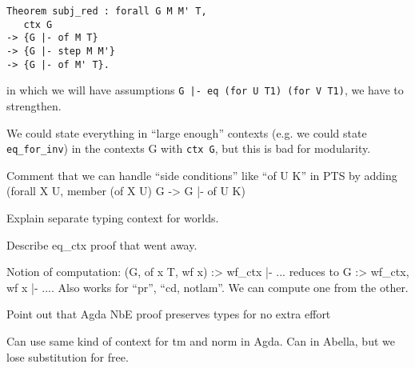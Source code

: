 \documentclass{article}
\begin{document}
\begin{verbatim}
Theorem subj_red : forall G M M' T,
   ctx G
-> {G |- of M T}
-> {G |- step M M'}
-> {G |- of M' T}.
\end{verbatim}

in which we will have assumptions
{\tt {G |- eq (for U T1) (for V T1)}}, we have to strengthen.

We could state everything in ``large enough'' contexts (e.g. we could
state {\tt eq\_for\_inv}) in the contexts G with {\tt ctx G}, but this is
bad for modularity.

Comment that we can handle ``side conditions'' like ``of U K'' in PTS
by adding (forall X U, member (of X U) G -> {G |- of U K})

Explain separate typing context for worlds.

Describe eq\_ctx proof that went away.

Notion of computation: { (G, of x T, wf x) :> wf\_ctx |- ...} reduces
to { G :> wf\_ctx, wf x |- ...}. Also works for ``pr'', ``cd,
notlam''. We can compute one from the other.

Point out that Agda NbE proof preserves types for no extra effort

Can use same kind of context for tm and norm in Agda. Can in Abella,
but we lose substitution for free.
\end{document}
